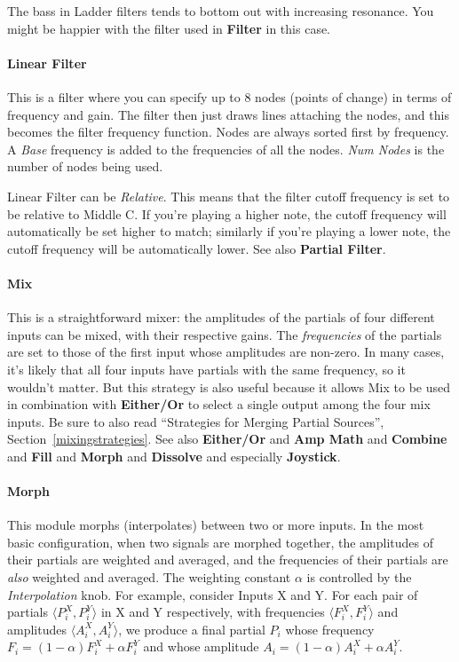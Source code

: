 \documentclass{article}
\begin{document}
The bass in Ladder filters tends to bottom out with increasing resonance.  You might be happier with the filter used in {\bf Filter} in this case.

\paragraph{Linear Filter} This is a filter where you can specify up to 8 nodes (points of change) in terms of frequency and gain.  The filter then just draws lines attaching the nodes, and this becomes the filter frequency function.  Nodes are always sorted first by frequency.  A {\it Base} frequency is added to the frequencies of all the nodes.  {\it Num Nodes} is the number of nodes being used.

Linear Filter can be {\it Relative}.  This means that the filter cutoff frequency is set to be relative to Middle C.  If you're playing a higher note, the cutoff frequency will automatically be set higher to match; similarly if you're playing a lower note, the cutoff frequency will be automatically lower.  See also {\bf Partial Filter}.

\paragraph{Mix} This is a straightforward mixer: the amplitudes of the partials of four different inputs can be mixed, with their respective gains.  The {\it frequencies} of the partials are set to those of the first input whose amplitudes are non-zero.  In many cases, it's likely that all four inputs have partials with the same frequency, so it wouldn't matter.  But this strategy is also useful because it allows Mix to be used in combination with {\bf Either/Or} to select a single output among the four mix inputs.  Be sure to also read ``Strategies for Merging Partial Sources'', Section~\ref{mixingstrategies}.  See also {\bf Either/Or} and {\bf Amp Math} and {\bf Combine} and {\bf Fill} and {\bf Morph} and {\bf Dissolve} and especially {\bf Joystick}.

\paragraph{Morph} This module morphs (interpolates) between two or more inputs.  In the most basic configuration, when two signals are morphed together, the amplitudes of their partials are weighted and averaged, and the frequencies of their partials are {\it also} weighted and averaged.  The weighting constant \(\alpha\) is controlled by the {\it Interpolation} knob.  For example, consider Inputs X and Y.  For each pair of partials \(\langle P^X_i, P^Y_i\rangle\) in X and Y respectively, with frequencies \(\langle F^X_i, F^Y_i\rangle\) and amplitudes \(\langle A^X_i, A^Y_i\rangle\), we produce a final partial \(P_i\) whose frequency \(F_i = (1-\alpha) F^X_i + \alpha F^Y_i\) and whose amplitude \(A_i = (1-\alpha) A^X_i + \alpha A^Y_i\).
\end{document}
